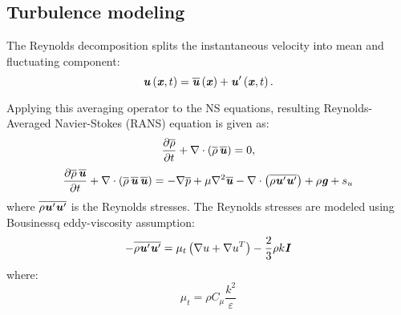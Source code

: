 \subsection*{Turbulence modeling}

The Reynolds decomposition splits the instantaneous velocity into mean and fluctuating component:
\begin{equation}
\textbf{\textit{u}} \left(\textbf{\textit{x}},t\right) = \overline{\textbf{\textit{u}}} \left(\textbf{\textit{x}}\right) + \textbf{\textit{u}}' \left(\textbf{\textit{x}},t\right).
\end{equation}

Applying this averaging operator to the NS equations, resulting Reynolds-Averaged Navier-Stokes (RANS) equation is given as:
\begin{equation}
\frac{\partial \overline{\rho}}{\partial t} + \nabla \cdot \left(\overline{\rho}\,\overline{\textbf{\textit{u}}}\right) = 0,
\end{equation}
\begin{equation}
\frac{\partial \overline{\rho}\,\overline{\textbf{\textit{u}}}}{\partial t}  + \nabla \cdot \left(\overline{\rho}\,\overline{\textbf{\textit{u}}}\,\overline{\textbf{\textit{u}}}\right) = -\nabla \overline{p} + \mu \nabla^2 \overline{\textbf{\textit{u}}} - \nabla \cdot \left(\overline{\rho \textbf{\textit{u}}' \textbf{\textit{u}}'}\right)+ \rho \textbf{\textit{g}} + s_u
\end{equation}
where $\overline{\rho \textbf{\textit{u}}' \textbf{\textit{u}}'}$ is the Reynolds stresses. The Reynolds stresses are modeled using Bousinessq eddy-viscosity assumption:
\begin{equation}
- \overline{\rho \textbf{\textit{u}}' \textbf{\textit{u}}'} = \mu_t \left(\nabla u + \nabla u^T\right) - \frac{2}{3}\rho k \textbf{\textit{I}}
\end{equation}
where:
\begin{equation}
\mu_t = \rho C_\mu \frac{k^2}{\varepsilon}
\end{equation}

